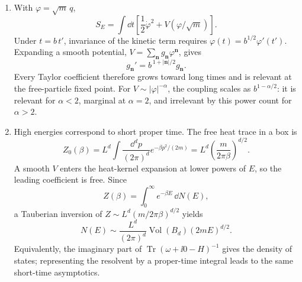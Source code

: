 \begin{enumerate}
  \begin{enumerate}
    \item[(a)] With \(\varphi=\sqrt m\,q\),
      \[
        S_E=\int \dd t\left[\frac12\dot\varphi^2+
          V(\varphi/\sqrt m)\right].
      \]
      Under \(t=b\,t'\), invariance of the kinetic term requires
      \(\varphi(t)=b^{1/2}\varphi'(t')\).  Expanding a smooth potential,
      \(V=\sum_{\mathbf n}g_{\mathbf n}\varphi^{\mathbf n}\), gives
      \[
        g_{\mathbf n}'=b^{\,1+|\mathbf n|/2}g_{\mathbf n}.
      \]
      Every Taylor coefficient therefore grows toward long times and is
      relevant at the free-particle fixed point.  For
      \(V\sim|\varphi|^{-\alpha}\), the coupling scales as
      \(b^{1-\alpha/2}\): it is relevant for \(\alpha<2\), marginal at
      \(\alpha=2\), and irrelevant by this power count for \(\alpha>2\).
    \item[(b)] High energies correspond to short proper time.  The free
      heat trace in a box is
      \[
        Z_0(\beta)
          =L^d\int\frac{\dd^dp}{(2\pi)^d}
             e^{-\beta p^2/(2m)}
          =L^d\left(\frac{m}{2\pi\beta}\right)^{d/2}.
      \]
      A smooth \(V\) enters the heat-kernel expansion at lower powers of
      \(E\), so the leading coefficient is free.  Since
      \[
        Z(\beta)=\int_0^\infty e^{-\beta E}\,\dd N(E),
      \]
      a Tauberian inversion of \(Z\sim
      L^d(m/2\pi\beta)^{d/2}\) yields
      \[
        N(E)\sim \frac{L^d}{(2\pi)^d}
          \operatorname{Vol}(B_d)(2mE)^{d/2}.
      \]
      Equivalently, the imaginary part of
      \(\operatorname{Tr}(\omega+\ii0-H)^{-1}\) gives the density of states;
      representing the resolvent by a proper-time integral leads to the
      same short-time asymptotics.
  \end{enumerate}

\end{enumerate}
